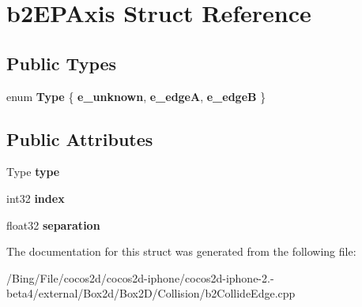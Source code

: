 \hypertarget{structb2_e_p_axis}{\section{b2\-E\-P\-Axis Struct Reference}
\label{structb2_e_p_axis}
}
\subsection*{Public Types}
\begin{DoxyCompactItemize}
\item 
enum {\bfseries Type} \{ {\bfseries e\-\_\-unknown}, 
{\bfseries e\-\_\-edge\-A}, 
{\bfseries e\-\_\-edge\-B}
 \}
\end{DoxyCompactItemize}
\subsection*{Public Attributes}
\begin{DoxyCompactItemize}
\item 
\hypertarget{structb2_e_p_axis_a336d3ba4b4ed020a1f6c4c0f70098e39}{Type {\bfseries type}}\label{structb2_e_p_axis_a336d3ba4b4ed020a1f6c4c0f70098e39}

\item 
\hypertarget{structb2_e_p_axis_a8e530d411d98e7ab8112c4022f5f65e4}{int32 {\bfseries index}}\label{structb2_e_p_axis_a8e530d411d98e7ab8112c4022f5f65e4}

\item 
\hypertarget{structb2_e_p_axis_acfd60cfd1f1ad4c448bd0260117ef6fc}{float32 {\bfseries separation}}\label{structb2_e_p_axis_acfd60cfd1f1ad4c448bd0260117ef6fc}

\end{DoxyCompactItemize}


The documentation for this struct was generated from the following file\-:\begin{DoxyCompactItemize}
\item 
/\-Bing/\-File/cocos2d/cocos2d-\/iphone/cocos2d-\/iphone-\/2.-\/beta4/external/\-Box2d/\-Box2\-D/\-Collision/b2\-Collide\-Edge.\-cpp\end{DoxyCompactItemize}
